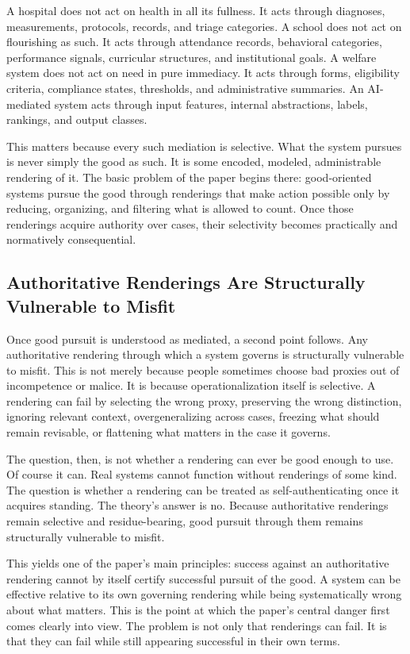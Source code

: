 \documentclass[11pt]{article}
\begin{document}
A hospital does not act on health in all its fullness. It acts through diagnoses, measurements, protocols, records, and triage categories. A school does not act on flourishing as such. It acts through attendance records, behavioral categories, performance signals, curricular structures, and institutional goals. A welfare system does not act on need in pure immediacy. It acts through forms, eligibility criteria, compliance states, thresholds, and administrative summaries. An AI-mediated system acts through input features, internal abstractions, labels, rankings, and output classes.

This matters because every such mediation is selective. What the system pursues is never simply the good as such. It is some encoded, modeled, administrable rendering of it. The basic problem of the paper begins there: good-oriented systems pursue the good through renderings that make action possible only by reducing, organizing, and filtering what is allowed to count. Once those renderings acquire authority over cases, their selectivity becomes practically and normatively consequential.

\subsection{Authoritative Renderings Are Structurally Vulnerable to Misfit}

Once good pursuit is understood as mediated, a second point follows. Any authoritative rendering through which a system governs is structurally vulnerable to misfit. This is not merely because people sometimes choose bad proxies out of incompetence or malice. It is because operationalization itself is selective. A rendering can fail by selecting the wrong proxy, preserving the wrong distinction, ignoring relevant context, overgeneralizing across cases, freezing what should remain revisable, or flattening what matters in the case it governs.\cite{Campbell1979AssessingImpactPlannedSocialChange,ManheimGarrabrant2019GoodhartsLaw}

The question, then, is not whether a rendering can ever be good enough to use. Of course it can. Real systems cannot function without renderings of some kind. The question is whether a rendering can be treated as self-authenticating once it acquires standing. The theory's answer is no. Because authoritative renderings remain selective and residue-bearing, good pursuit through them remains structurally vulnerable to misfit.

This yields one of the paper's main principles: success against an authoritative rendering cannot by itself certify successful pursuit of the good. A system can be effective relative to its own governing rendering while being systematically wrong about what matters. This is the point at which the paper's central danger first comes clearly into view. The problem is not only that renderings can fail. It is that they can fail while still appearing successful in their own terms.
\end{document}
